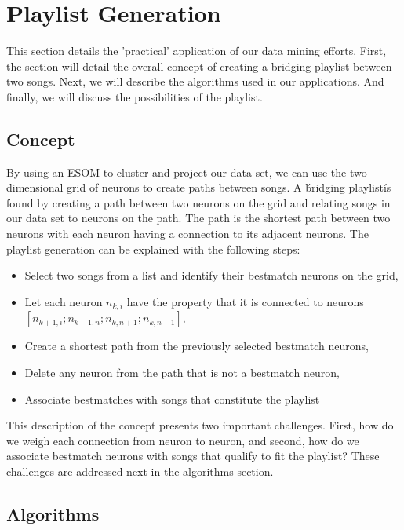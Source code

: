 \section{Playlist Generation} %
\label{sec:playlist_generation}

This section details the 'practical' application of our data mining efforts. First, the section will detail
the overall concept of creating a bridging playlist between two songs. Next, we will describe the algorithms used in our applications. And finally, we will discuss the possibilities of the playlist.

\subsection{Concept}
By using an ESOM to cluster and project our data set, we can use the two-dimensional grid of neurons to create paths between songs. A \'bridging playlist\' is found by creating a path between two neurons on the grid and relating songs in our data set to neurons on the path. The path is the shortest path between two neurons with each neuron having a connection to its adjacent neurons. The playlist generation can be explained with the following steps:
\begin{itemize}
\item Select two songs from a list and identify their bestmatch neurons on the grid, \\
\item Let each neuron $ n_{k,i} $  have the property that it is connected to neurons $ [ n_{k+1,i} ; n_{k-1,n} ; n_{k,n+1} ; n_{k,n-1} ], $ \\
\item Create a shortest path from the previously selected bestmatch neurons, \\
\item Delete any neuron from the path that is not a bestmatch neuron, \\
\item Associate bestmatches with songs that constitute the playlist
\end{itemize}

This description of the concept presents two important challenges. First, how do we weigh each connection from neuron to neuron, and second, how do we associate bestmatch neurons with songs that qualify to fit the playlist?
These challenges are addressed next in the algorithms section.

\subsection{Algorithms}


